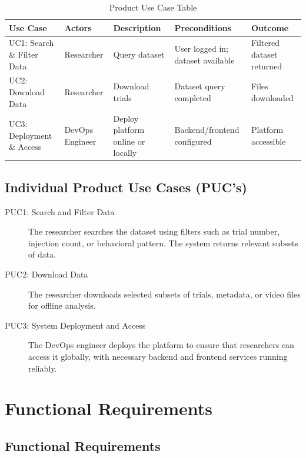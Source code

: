 \documentclass[12pt]{article}
\begin{document}
\begin{table}[H]
\centering
\begin{tabular}{|p{2.5cm}|p{2cm}|p{3.0cm}|p{3.0cm}|p{2.5cm}|}
\hline
\textbf{Use Case} & \textbf{Actors} & \textbf{Description} & \textbf{Preconditions} & \textbf{Outcome} \\
\hline
UC1: Search \& Filter Data & Researcher & Query dataset & User logged in; dataset available & Filtered dataset returned \\
\hline
UC2: Download Data & Researcher & Download trials & Dataset query completed & Files downloaded \\
\hline
UC3: Deployment \& Access & DevOps Engineer & Deploy platform online or locally & Backend/frontend configured & Platform accessible \\
\hline
\end{tabular}
\caption{Product Use Case Table}
\end{table}

\subsection{Individual Product Use Cases (PUC’s)}

\begin{description}
\item[PUC1: Search and Filter Data] The researcher searches the dataset using filters such as trial number, injection count, or behavioral pattern. The system returns relevant subsets of data.
\item[PUC2: Download Data] The researcher downloads selected subsets of trials, metadata, or video files for offline analysis.
\item[PUC3: System Deployment and Access] The DevOps engineer deploys the platform to ensure that researchers can access it globally, with necessary backend and frontend services running reliably.
\end{description}

\section{Functional Requirements}
\subsection{Functional Requirements}
\end{document}
